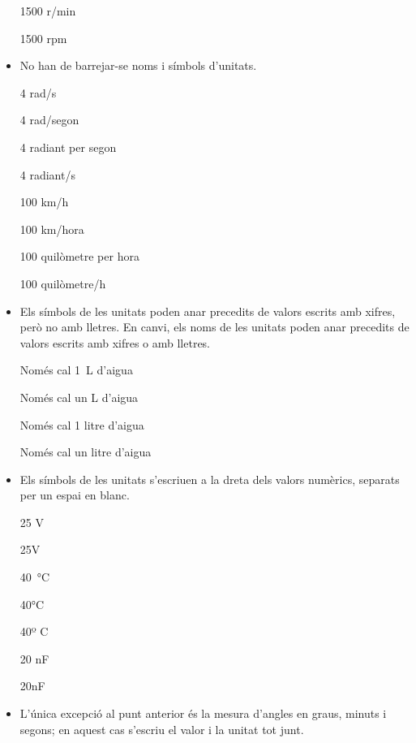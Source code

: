 \begin{itemize}
\textcolor{Green}\faCheckSquare{} 1500 r/min

\textcolor{Red}\faTimesCircle{} 1500 rpm

\item No han de barrejar-se noms i símbols d'unitats.

\textcolor{Green}\faCheckSquare{} 4 rad/s

\textcolor{Red}\faTimesCircle{} 4 rad/segon

\textcolor{Green}\faCheckSquare{} 4 radiant per segon

\textcolor{Red}\faTimesCircle{} 4 radiant/s

\textcolor{Green}\faCheckSquare{} 100 km/h

\textcolor{Red}\faTimesCircle{} 100 km/hora

\textcolor{Green}\faCheckSquare{} 100 quilòmetre per hora

\textcolor{Red}\faTimesCircle{} 100 quilòmetre/h


\item Els símbols de les unitats  poden anar precedits de valors escrits amb xifres, però no amb lletres. En canvi, els noms de les unitats poden anar precedits de valors escrits amb xifres o amb lletres. 

\textcolor{Green}\faCheckSquare{} Només cal \qty{1}{L} d'aigua

\textcolor{Red}\faTimesCircle{} Només cal un L d'aigua

\textcolor{Green}\faCheckSquare{} Només cal 1 litre d'aigua

\textcolor{Green}\faCheckSquare{} Només cal un litre d'aigua



\item Els símbols de les unitats s'escriuen a la dreta dels valors
numèrics, separats per un espai en blanc.

\textcolor{Green}\faCheckSquare{} 25 V

\textcolor{Red}\faTimesCircle{} 25V

\textcolor{Green}\faCheckSquare{} \qty{40}{\degreeCelsius}

\textcolor{Red}\faTimesCircle{} 40\unit{\degreeCelsius}

\textcolor{Red}\faTimesCircle{} 40º C

\textcolor{Green}\faCheckSquare{} 20 nF

\textcolor{Red}\faTimesCircle{} 20nF


\item  L'única excepció al punt anterior és la mesura d'angles en graus, minuts i segons; en aquest cas s'escriu el valor i la unitat tot junt.


\end{itemize}
